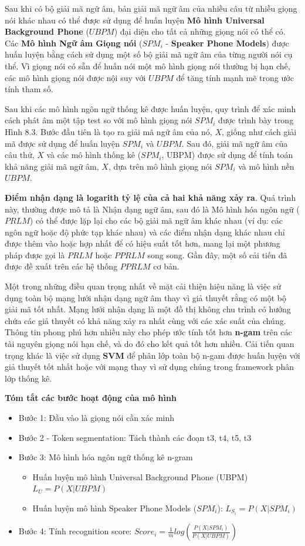 \documentclass{article}
\begin{document}
	Sau khi có bộ giải mã ngữ âm, bản giải mã ngữ âm của nhiều câu từ nhiều giọng nói khác nhau có thể được sử dụng để huấn luyện \textbf{Mô hình Universal Background Phone} ($UBPM$) đại diện cho tất cả những giọng nói có thể có. Các \textbf{Mô hình Ngữ âm Giọng nói} ($SPM_i$ - \textbf{Speaker Phone Models}) được huấn luyện bằng cách sử dụng một số bộ giải mã ngữ âm của từng người nói cụ thể. Vì giọng nói có sẵn để huấn nói một mô hình giọng nói thường bị hạn chế, các mô hình giọng nói được nội suy với $UBPM$ để tăng tính mạnh mẽ trong ước tính tham số. 
	
	Sau khi các mô hình ngôn ngữ thống kê được huấn luyện, quy trình để xác minh cách phát âm một tập test so với mô hình giọng nói $SPM_i$ được trình bày trong Hình 8.3. Bước đầu tiên là tạo ra giải mã ngữ âm của nó, $X$, giống như cách giải mã được sử dụng để huấn luyện $SPM_{i}$ và $UBPM$. Sau đó, giải mã ngữ âm của câu thử, $X$ và các mô hình thống kê ($SPM_{i}$, UBPM) được sử dụng để tính toán khả năng giải mã ngữ âm, $X$, dựa trên mô hình giọng nói $SPM_{i}$ và mô hình nền $UBPM$. 
	
	\textbf{Điểm nhận dạng là logarith tỷ lệ của cả hai khả năng xảy ra}. Quá trình này, thường được mô tả là Nhận dạng ngữ âm, sau đó là Mô hình hóa ngôn ngữ ($PRLM$) có thể được lặp lại cho các bộ giải mã ngữ âm khác nhau (ví dụ: các ngôn ngữ hoặc độ phức tạp khác nhau) và các điểm nhận dạng khác nhau chỉ được thêm vào hoặc hợp nhất để có hiệu suất tốt hơn, mang lại một phương pháp được gọi là $PRLM$ hoặc $PPRLM$ song song. Gần đây, một số cải tiến đã được đề xuất trên các hệ thống $PPRLM$ cơ bản. 
	
	Một trong những điều quan trọng nhất về mặt cải thiện hiệu năng là việc sử dụng toàn bộ mạng lưới nhận dạng ngữ âm thay vì giả thuyết rằng có một bộ giải mã tốt nhất. Mạng lưới nhận dạng là một đồ thị không chu trình có hướng chứa các giả thuyết có khả năng xảy ra nhất cùng với các xác suất của chúng. Thông tin phong phú hơn nhiều này cho phép ước tính tốt hơn \textbf{n-gam} trên các tài nguyên giọng nói hạn chế, và do đó cho kết quả tốt hơn nhiều. Cải tiến quan trọng khác là việc sử dụng \textbf{SVM} để phân lớp toàn bộ n-gam được huấn luyện với giả thuyết tốt nhất hoặc với mạng thay vì sử dụng chúng trong framework phân lớp thống kê.
	
	\textbf{Tóm tắt các bước hoạt động của mô hình}
	\begin{itemize}
		\item Bước 1: Đầu vào là giọng nói cần xác minh
		\item Bước 2 - Token segmentation: Tách thành các đoạn t3, t4, t5, t3
		\item Bước 3: Mô hình hóa ngôn ngữ thống kê n-gram
		\begin{itemize}
			\item Huấn luyện mô hình Universal Background Phone (UBPM) $L_{U} = P(X|UBPM)$
			\item Huấn luyện mô hình Speaker Phone Models ($SPM_{i}$): $L_{S_{i}} = P(X | SPM_{i})$
		\end{itemize}
		\item Bước 4: Tính recognition score: $Score_{i} = \frac{1}{m}log\left(\frac{P(X | SPM_{i})}{P(X|UBPM)}\right)$
	\end{itemize}
\end{document}
